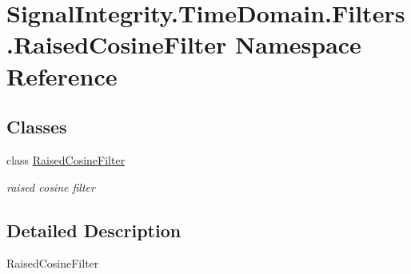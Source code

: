 \hypertarget{namespaceSignalIntegrity_1_1TimeDomain_1_1Filters_1_1RaisedCosineFilter}{}\section{Signal\+Integrity.\+Time\+Domain.\+Filters.\+Raised\+Cosine\+Filter Namespace Reference}
\label{namespaceSignalIntegrity_1_1TimeDomain_1_1Filters_1_1RaisedCosineFilter}
\subsection*{Classes}
\begin{DoxyCompactItemize}
\item 
class \hyperlink{classSignalIntegrity_1_1TimeDomain_1_1Filters_1_1RaisedCosineFilter_1_1RaisedCosineFilter}{Raised\+Cosine\+Filter}
\begin{DoxyCompactList}\small\item\em raised cosine filter \end{DoxyCompactList}\end{DoxyCompactItemize}


\subsection{Detailed Description}
\begin{DoxyVerb}RaisedCosineFilter\end{DoxyVerb}
 